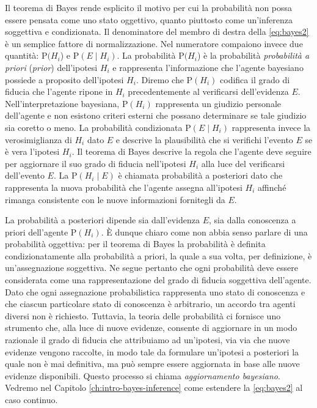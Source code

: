\documentclass[
  11pt,
]{krantz}
\theoremstyle{definition}
\theoremstyle{definition}
\theoremstyle{definition}
\theoremstyle{definition}
\theoremstyle{remark}
\begin{document}
Il teorema di Bayes rende esplicito il motivo per cui la probabilità non possa essere pensata come uno stato oggettivo, quanto piuttosto come un'inferenza soggettiva e condizionata. Il denominatore del membro di destra della \eqref{eq:bayes2} è un semplice fattore di normalizzazione. Nel numeratore compaiono invece due quantità: \({\mbox{P}}(H_i\)) e \({\mbox{P}}(E \mid H_i)\). La probabilità \({\mbox{P}}(H_i\)) è la probabilità \emph{probabilità a priori} (\emph{prior}) dell'ipotesi \(H_i\) e rappresenta l'informazione che l'agente bayesiano possiede a proposito dell'ipotesi \(H_i\). Diremo che \({\mbox{P}}(H_i)\) codifica il grado di fiducia che l'agente ripone in \(H_i\) precedentemente al verificarsi dell'evidenza \(E\). Nell'interpretazione bayesiana, \({\mbox{P}}(H_i)\) rappresenta un giudizio personale dell'agente e non esistono criteri esterni che possano determinare se tale giudizio sia coretto o meno. La probabilità condizionata \({\mbox{P}}(E \mid H_i)\) rappresenta invece la verosimiglianza di \(H_i\) dato \(E\) e descrive la plausibilità che si verifichi l'evento \(E\) se è vera l'ipotesi \(H_i\). Il teorema di Bayes descrive la regola che l'agente deve seguire per aggiornare il suo grado di fiducia nell'ipotesi \(H_i\) alla luce del verificarsi dell'evento \(E\). La \({\mbox{P}}(H_i \mid E)\) è chiamata probabilità a posteriori dato che rappresenta la nuova probabilità che l'agente assegna all'ipotesi \(H_i\) affinché rimanga consistente con le nuove informazioni fornitegli da \(E\).

La probabilità a posteriori dipende sia dall'evidenza \(E\), sia dalla conoscenza a priori dell'agente \({\mbox{P}}(H_i)\). È dunque chiaro come non abbia senso parlare di una probabilità oggettiva: per il teorema di Bayes la probabilità è definita condizionatamente alla probabilità a priori, la quale a sua volta, per definizione, è un'assegnazione soggettiva. Ne segue pertanto che ogni probabilità deve essere considerata come una rappresentazione del grado di fiducia soggettiva dell'agente. Dato che ogni assegnazione probabilistica rappresenta uno stato di conoscenza e che ciascun particolare stato di conoscenza è arbitrario, un accordo tra agenti diversi non è richiesto. Tuttavia, la teoria delle probabilità ci fornisce uno strumento che, alla luce di nuove evidenze, consente di aggiornare in un modo razionale il grado di fiducia che attribuiamo ad un'ipotesi, via via che nuove evidenze vengono raccolte, in modo tale da formulare un'ipotesi a posteriori la quale non è mai definitiva, ma può sempre essere aggiornata in base alle nuove evidenze disponibili. Questo processo si chiama \emph{aggiornamento bayesiano}. Vedremo nel Capitolo \ref{ch:intro-bayes-inference} come estendere la \eqref{eq:bayes2} al caso continuo.
\end{document}
